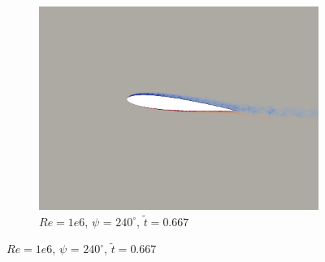 \begin{figure}[H]
\begin{subfigure}[b]{0.32\textwidth}
		\includegraphics[width=1\textwidth]{figures/Vorticity_plots/Re_1m_1pt0/phase_240.png}
		\caption{$Re=1e6$, $\psi$ = $240^\circ$, $\tilde{t}=0.667$}
		\label{fig:Re_1m_1pt0_phi240}
	\end{subfigure}
	

\end{figure}
